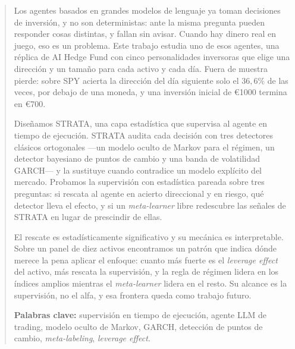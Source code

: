 \renewcommand{\abstractname}{Resumen}
\begin{abstract}
    Los agentes basados en grandes modelos de lenguaje ya toman decisiones de inversión, y no son deterministas: ante la misma pregunta pueden responder cosas distintas, y fallan sin avisar. Cuando hay dinero real en juego, eso es un problema. Este trabajo estudia uno de esos agentes, una réplica de AI Hedge Fund con cinco personalidades inversoras que elige una dirección y un tamaño para cada activo y cada día. Fuera de muestra pierde: sobre SPY acierta la dirección del día siguiente solo el $36{,}6\%$ de las veces, por debajo de una moneda, y una inversión inicial de \euro{}1000 termina en \euro{}700.

    Diseñamos STRATA, una capa estadística que supervisa al agente en tiempo de ejecución. STRATA audita cada decisión con tres detectores clásicos ortogonales —un modelo oculto de Markov para el régimen, un detector bayesiano de puntos de cambio y una banda de volatilidad GARCH— y la sustituye cuando contradice un modelo explícito del mercado. Probamos la supervisión con estadística pareada sobre tres preguntas: si rescata al agente en acierto direccional y en riesgo, qué detector lleva el efecto, y si un \emph{meta-learner} libre redescubre las señales de STRATA en lugar de prescindir de ellas.

    El rescate es estadísticamente significativo y su mecánica es interpretable. Sobre un panel de diez activos encontramos un patrón que indica dónde merece la pena aplicar el enfoque: cuanto más fuerte es el \emph{leverage effect} del activo, más rescata la supervisión, y la regla de régimen lidera en los índices amplios mientras el \emph{meta-learner} lidera en el resto. Su alcance es la supervisión, no el alfa, y esa frontera queda como trabajo futuro.

    \medskip
    \noindent\textbf{Palabras clave:} supervisión en tiempo de ejecución, agente LLM de trading, modelo oculto de Markov, GARCH, detección de puntos de cambio, \emph{meta-labeling}, \emph{leverage effect}.
    \end{abstract}
